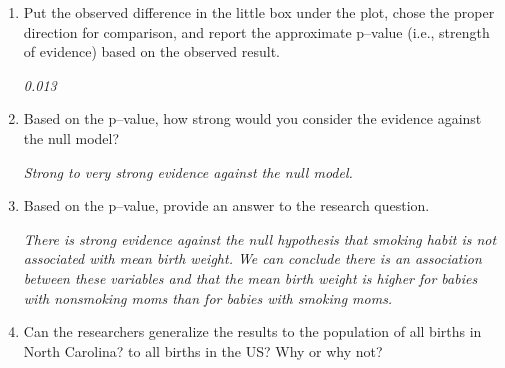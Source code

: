 \begin{enumerate}
\begin{students}
 \vspace{1cm}  
\end{students}

\begin{key}
  {\it  The mean birth weight for babies whose mother smoked is lower
  than the mean birth weight for babies whose mothers did not
  smoke. Use greater than 0.778}
\end{key}

 
\item   Put the observed difference in the little box under the plot,
  chose the proper direction for comparison, and report the
  approximate p--value (i.e., strength of evidence) 
  based on the observed result. 
\begin{students}
 \vspace{1cm}
\end{students}

\begin{key}
  {\it  0.013}
\end{key}

\item  Based on the p--value, how strong would you consider the
  evidence against the null model?  
\begin{students}
 \vspace{1cm}
\end{students}

\begin{key}
  {\it  Strong  to very strong evidence against the null model.}
\end{key}

   
\item  Based on the p--value, provide an answer to the research
  question.  
\begin{students}
 \vspace{1cm}
\end{students}

\begin{key}
  {\it There is strong evidence against the null hypothesis
  that smoking habit is not associated with mean birth weight.  We can
  conclude there is an association 
  between these variables and that the mean birth weight
   is higher for babies with nonsmoking moms than for babies with
   smoking moms.}
\end{key}

  

\item  Can the researchers generalize the results to the population of
  all births in North Carolina?  to all births in the US? Why or why not?
\begin{students}
 \vspace{1cm} 
\end{students}


\end{enumerate}
